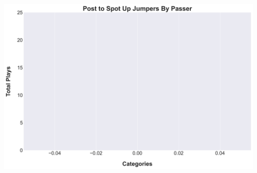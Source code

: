 \documentclass[a4paper,12pt]{article}
\begin{document}
\begin{table}[H]
{\begin{minipage}[t]{0.6\textwidth}
{\begin{tabular}
                
            
                
            
                
                    
                
            
                
            
                
            
                
            
                
            
                
            
                
            
                
            

            \bottomrule
        \end{tabular}
        } %
    \end{minipage}
    } %
    \hfill %
    \begin{minipage}[c]{0.35\textwidth} %
        \flushright
        \includegraphics[width=\textwidth, height=.14\textheight]{images/SpotUp_PostShotsPlayer_Freq.png} %
    \end{minipage}
\end{table}

\vspace{-1em} %
\vspace{-1em} %
\end{document}
